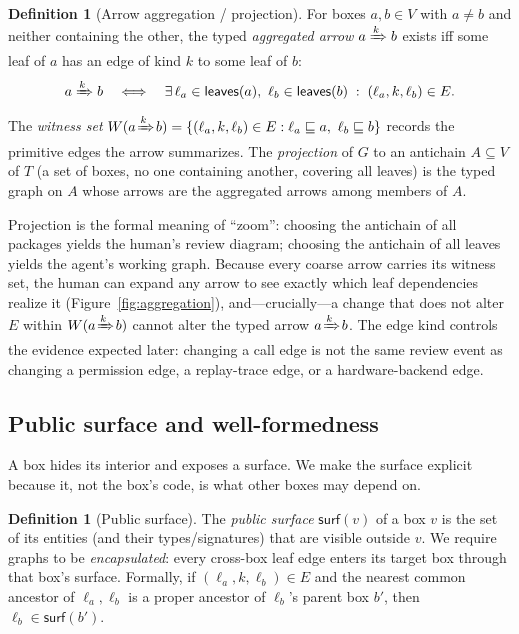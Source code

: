 \documentclass[sigconf,review,anonymous]{acmart}
\theoremstyle{plain}
\theoremstyle{definition}
\newtheorem{definition}[theorem]{Definition}
\begin{document}
\begin{definition}[Arrow aggregation / projection]\label{def:agg}
For boxes $a,b \in V$ with $a \neq b$ and neither containing the other, the
typed \emph{aggregated arrow} $a \xRightarrow{k} b$ exists iff some leaf of $a$
has an edge of kind $k$ to some leaf of $b$:
\[
a \xRightarrow{k} b \quad\Longleftrightarrow\quad
\exists\, \ell_a \in \mathsf{leaves}(a),\ \ell_b \in \mathsf{leaves}(b)
\;:\; (\ell_a,k,\ell_b)\in E .
\]
The \emph{witness set} $W(a\!\xRightarrow{k}\! b)=\{(\ell_a,k,\ell_b)\in E :
\ell_a\sqsubseteq a,\ \ell_b\sqsubseteq b\}$ records the primitive edges the
arrow summarizes. The \emph{projection} of $G$ to an antichain $A\subseteq V$ of
$T$ (a set of boxes, no one containing another, covering all leaves) is the
typed graph on $A$ whose arrows are the aggregated arrows among members of $A$.
\end{definition}

Projection is the formal meaning of ``zoom'': choosing the antichain of all
packages yields the human's review diagram; choosing the antichain of all
leaves yields the agent's working graph. Because every coarse arrow carries its
witness set, the human can expand any arrow to see exactly which leaf
dependencies realize it (Figure~\ref{fig:aggregation}), and---crucially---a
change that does not alter $E$ within $W(a\!\xRightarrow{k}\! b)$ cannot alter
the typed arrow $a\!\xRightarrow{k}\! b$. The edge kind controls the evidence expected later:
changing a call edge is not the same review event as changing a permission edge,
a replay-trace edge, or a hardware-backend edge.

\subsection{Public surface and well-formedness}

A box hides its interior and exposes a surface. We make the surface explicit
because it, not the box's code, is what other boxes may depend on.

\begin{definition}[Public surface]\label{def:surface}
The \emph{public surface} $\mathsf{surf}(v)$ of a box $v$ is the set of its
entities (and their types/signatures) that are visible outside $v$. We require
graphs to be \emph{encapsulated}: every cross-box leaf edge enters its target
box through that box's surface. Formally, if $(\ell_a,k,\ell_b)\in E$ and the
nearest common ancestor of $\ell_a,\ell_b$ is a proper ancestor of $\ell_b$'s
parent box $b'$, then $\ell_b \in \mathsf{surf}(b')$.
\end{definition}
\end{document}
